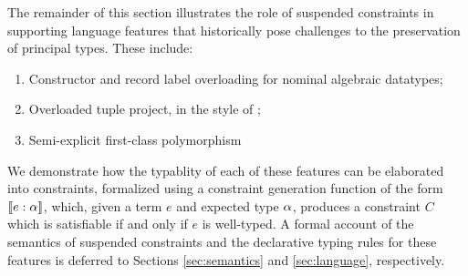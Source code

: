 \documentclass[acmsmall,screen,nonacm]{acmart}
\begin{document}

The remainder of this section illustrates the role of suspended constraints in supporting 
language features that historically pose challenges to the preservation of principal types. 
These include:
\begin{enumerate}
  \item Constructor and record label overloading for nominal algebraic datatypes; 
  \item Overloaded tuple project, in the style of \SML; 
  \item Semi-explicit first-class polymorphism
\end{enumerate}
We demonstrate how the typablity of each of these features can be elaborated into 
constraints, formalized using a constraint generation function of the form $\llbracket e : \alpha \rrbracket$, 
which, given a term $e$ and expected type $\alpha$, produces a constraint $C$ which is satisfiable if 
and only if $e$ is well-typed. A formal account of the semantics of suspended constraints 
and the declarative typing rules for these features is deferred to Sections \ref{sec:semantics}
and \ref{sec:language}, respectively. 


\end{document}
